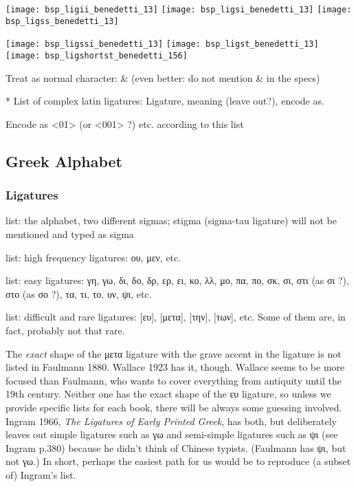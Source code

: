 \texttt{[image: bsp\_ligii\_benedetti\_13]}
\texttt{[image: bsp\_ligsi\_benedetti\_13]}
\texttt{[image: bsp\_ligss\_benedetti\_13]}

\texttt{[image: bsp\_ligssi\_benedetti\_13]}
\texttt{[image: bsp\_ligst\_benedetti\_13]}
\texttt{[image: bsp\_ligshortst\_benedetti\_156]}

Treat as normal character: \& (even better: do not mention \& in the specs)

* List of complex latin ligatures: Ligature, meaning (leave out?), encode as.

Encode as <01> (or <001> ?) etc. according to this list

\subsection{Greek Alphabet}



\subsubsection{Ligatures}

list: the alphabet, two different sigmas; stigma (sigma-tau ligature) will not be mentioned and typed as sigma

list: high frequency ligatures: ου, μεν, etc.

list: easy ligatures: γη, γω, δι, δο, δρ, ερ, ει, κο, λλ, μο, πα, πο, σκ, σι, στι  (as σι ?), στο  (as σο ?), τα, τι, το, υν, ψι, etc. 

list: difficult and rare ligatures: [ευ], [μετα], [την], [των], etc. Some of them are, in fact, probably not that rare. 

The \emph{exact} shape of the μετα ligature with the grave accent in the ligature is not listed in Faulmann 1880. Wallace 1923 has it, though. Wallace seems to be more focused than Faulmann, who wants to cover everything from antiquity until the 19th century. 
Neither one has the exact shape of the ευ ligature, so unless we provide specific lists for each book, there will be always some guessing involved. Ingram 1966, \emph{The Ligatures of Early Printed Greek}, has both, but deliberately leaves out simple ligatures such as γω and semi-simple ligatures such as ψι (see Ingram p.380) because he didn't think of Chinese typists. (Faulmann has ψι, but not γω.) In short, perhaps the easiest path for us would be to reproduce (a subset of) Ingram's list. 

